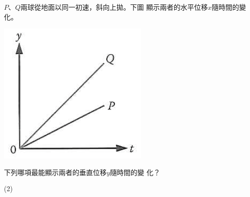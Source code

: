 {
    $P$、$Q$兩球從地面以同一初速，斜向上拋。下圖 顯示兩者的水平位移$x$隨時間的變化。\bigskip
    {
        \par
        \centering
        \includegraphics[width=0.3\linewidth]{assets/image.png}
        \par
    }\bigskip
    下列哪項最能顯示兩者的垂直位移$y$隨時間的變 化？
    \begin{tasks}(2)
        \task
        \task
        \task

\end{tasks}}
